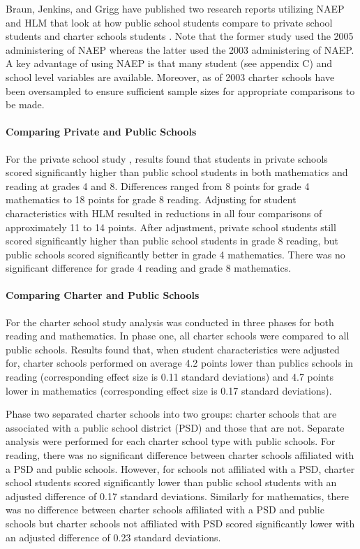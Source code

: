 \documentclass[letterpaper,12p,twoside]{article} %
\begin{document}
Braun, Jenkins, and Grigg have published two research reports utilizing NAEP and HLM that look at how public school students compare to private school students \citeyear{BraunJenkinsGrigg2006private} and charter schools students \citeyear{BraunJenkinsGrigg2006}. Note that the former study used the 2005 administering of NAEP whereas the latter used the 2003 administering of NAEP. A key advantage of using NAEP is that many student (see appendix C) and school level variables are available. Moreover, as of 2003 charter schools have been oversampled to ensure sufficient sample sizes for appropriate comparisons to be made. 

\paragraph{Comparing Private and Public Schools}
For the private school study \cite{BraunJenkinsGrigg2006private}, results found that students in private schools scored significantly higher than public school students in both mathematics and reading at grades 4 and 8. Differences ranged from 8 points for grade 4 mathematics to 18 points for grade 8 reading. Adjusting for student characteristics with HLM resulted in reductions in all four comparisons of approximately 11 to 14 points. After adjustment, private school students still scored significantly higher than public school students in grade 8 reading, but public schools scored significantly better in grade 4 mathematics. There was no significant difference for grade 4 reading and grade 8 mathematics.

\paragraph{Comparing Charter and Public Schools}
For the charter school study \cite{BraunJenkinsGrigg2006} analysis was conducted in three phases for both reading and mathematics. In phase one, all charter schools were compared to all public schools. Results found that, when student characteristics were adjusted for, charter schools performed on average 4.2 points lower than publics schools in reading (corresponding effect size is 0.11 standard deviations) and 4.7 points lower in mathematics (corresponding effect size is 0.17 standard deviations). 

Phase two separated charter schools into two groups: charter schools that are associated with a public school district (PSD) and those that are not. Separate analysis were performed for each charter school type with public schools. For reading, there was no significant difference between charter schools affiliated with a PSD and public schools. However, for schools not affiliated with a PSD, charter school students scored significantly lower than public school students with an adjusted difference of 0.17 standard deviations. Similarly for mathematics, there was no difference between charter schools affiliated with a PSD and public schools but charter schools not affiliated with PSD scored significantly lower with an adjusted difference of 0.23 standard deviations.
\end{document}
